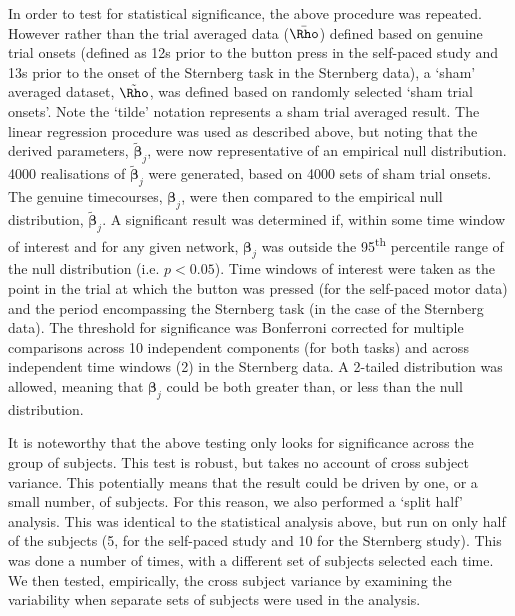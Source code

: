 In order to test for statistical significance, the above procedure was repeated. However rather than the trial averaged data ($\bar{\mathbf{\Rho}}$) defined based on genuine trial onsets (defined as 12s prior to the button press in the self-paced study and 13s prior to the onset of the Sternberg task in the Sternberg data), a ‘sham’ averaged dataset, $\tilde{\mathbf{\Rho}}$, was defined based on randomly selected ‘sham trial onsets’. Note the ‘tilde’ notation represents a sham trial averaged result. The linear regression procedure was used as described above, but noting that the derived parameters, $\tilde{\mathbf{\beta}}_j$, were now representative of an empirical null distribution. 4000 realisations of  $\tilde{\mathbf{\beta}}_j$ were generated, based on 4000 sets of sham trial onsets. The genuine timecourses, $\mathbf{\beta}_j$, were then compared to the empirical null distribution, $\tilde{\mathbf{\beta}}_j$. A significant result was determined if, within some time window of interest and for any given network, $\mathbf{\beta}_j$ was outside the 95\textsuperscript{th} percentile range of the null distribution (i.e. $p<0.05$). Time windows of interest were taken as the point in the trial at which the button was pressed (for the self-paced motor data) and the period encompassing the Sternberg task (in the case of the Sternberg data). The threshold for significance was Bonferroni corrected for multiple comparisons across 10 independent components (for both tasks) and across independent time windows (2) in the Sternberg data. A 2-tailed distribution was allowed, meaning that $\mathbf{\beta}_j$ could be both greater than, or less than the null distribution.

It is noteworthy that the above testing only looks for significance across the group of subjects. This test is robust, but takes no account of cross subject variance. This potentially means that the result could be driven by one, or a small number, of subjects. For this reason, we also performed a ‘split half’ analysis. This was identical to the statistical analysis above, but run on only half of the subjects (5, for the self-paced study and 10 for the Sternberg study). This was done a number of times, with a different set of subjects selected each time. We then tested, empirically, the cross subject variance by examining the variability when separate sets of subjects were used in the analysis.


